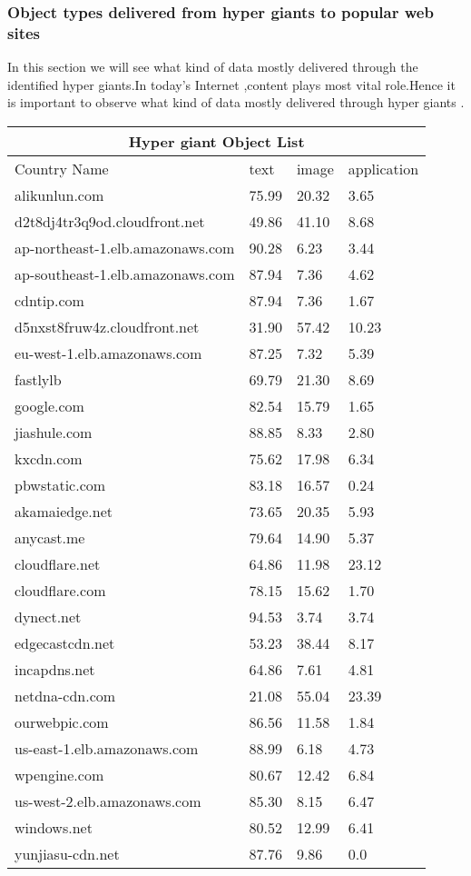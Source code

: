 \subsubsection{Object types delivered from hyper giants to popular web sites}
In this section we will see what kind of data mostly delivered through the identified hyper giants.In today's Internet ,content plays most vital role.Hence it is important to observe what kind of data mostly delivered through hyper giants .
\newline
\newline
\begin{tabular}{ |p{6cm}||p{2cm}|p{2cm}|p{2cm}| }
 \hline
 \multicolumn{4}{|c|}{Hyper giant Object List} \\
 \hline
 Country Name     & text&image&application\\
 \hline
 alikunlun.com   & 75.99    &20.32&   3.65 \\
d2t8dj4tr3q9od.cloudfront.net&   49.86  & 41.10   &8.68\\
 ap-northeast-1.elb.amazonaws.com &90.28 & 6.23&  3.44\\
 ap-southeast-1.elb.amazonaws.com    &87.94 & 7.36&  4.62\\
 cdntip.com&   87.94  & 7.36&1.67\\
 d5nxst8fruw4z.cloudfront.net& 31.90  & 57.42   &10.23\\
 eu-west-1.elb.amazonaws.com& 87.25  & 7.32&5.39\\
 fastlylb& 69.79  &21.30&8.69\\
 google.com&82.54  & 15.79&1.65\\
 jiashule.com& 88.85  & 8.33&2.80\\
 kxcdn.com& 75.62  & 17.98&6.34\\
pbwstatic.com& 83.18  &16.57&0.24\\ 
 akamaiedge.net&73.65  & 20.35&5.93\\ 
 anycast.me& 79.64  & 14.90&5.37\\
 cloudflare.net& 64.86  & 11.98&23.12\\
 cloudflare.com& 78.15  & 15.62&1.70\\ 
dynect.net& 94.53  & 3.74&3.74\\
 edgecastcdn.net& 53.23 & 38.44&8.17\\ 
incapdns.net& 64.86  & 7.61&4.81\\
 netdna-cdn.com& 21.08  & 55.04&23.39\\ 
ourwebpic.com& 86.56  & 11.58&1.84\\
 us-east-1.elb.amazonaws.com& 88.99  & 6.18&4.73\\ 
wpengine.com& 80.67  & 12.42&6.84\\
 us-west-2.elb.amazonaws.com&85.30  & 8.15&6.47\\ 
windows.net& 80.52  & 12.99&6.41\\
 yunjiasu-cdn.net& 87.76  & 9.86&0.0\\ 
 \hline
\end{tabular}
\newline

